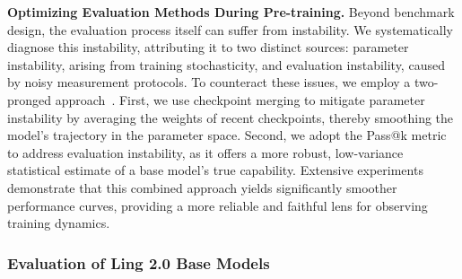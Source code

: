 {\bfseries Optimizing Evaluation Methods During Pre-training. }
Beyond benchmark design, the evaluation process itself can suffer from instability. We systematically diagnose this instability, attributing it to two distinct sources: parameter instability, arising from training stochasticity, and evaluation instability, caused by noisy measurement protocols. 
To counteract these issues, we employ a two-pronged approach~\citep{wang2025map}. First, we use checkpoint merging to mitigate parameter instability by averaging the weights of recent checkpoints, thereby smoothing the model's trajectory in the parameter space. Second, we adopt the Pass@k metric to address evaluation instability, as it offers a more robust, low-variance statistical estimate of a base model's true capability. Extensive experiments demonstrate that this combined approach yields significantly smoother performance curves, providing a more reliable and faithful lens for observing training dynamics.

\subsubsection{{Evaluation of Ling 2.0 Base Models}}
\label{sec:eval_base_results}

